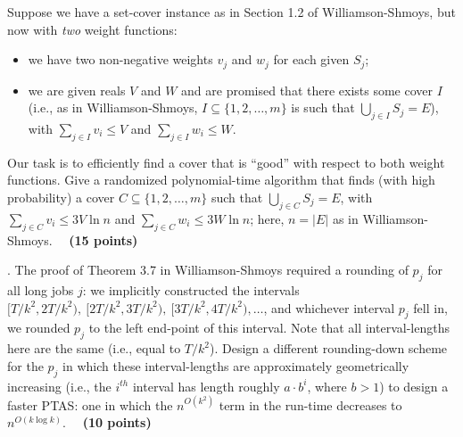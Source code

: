 \documentclass{article}[11pt]
\begin{document}
Suppose we have a set-cover instance as in Section 1.2 of Williamson-Shmoys, but now with \emph{two} weight functions:
\begin{itemize}
\item we have two non-negative weights $v_j$ and $w_j$ for each given $S_j$;
\item we are given reals $V$ and $W$ and are promised that there exists some cover $I$ (i.e., as in Williamson-Shmoys, $I \subseteq \{1, 2, \ldots, m\}$ is such that $\bigcup_{j \in I} S_j = E$), with 
$\sum_{j \in I} v_i \leq V$ and $\sum_{j \in I} w_i \leq W$.
\end{itemize}
Our task is to efficiently find a cover that is ``good'' with respect to both weight functions. Give a randomized polynomial-time algorithm that finds (with high probability) a cover $C \subseteq \{1, 2, \ldots, m\}$ such that $\bigcup_{j \in C} S_j = E$, with $\sum_{j \in C} v_i \leq 3 V \ln n$ and $\sum_{j \in C} w_i \leq 3 W \ln n$; here, $n = |E|$ as in Williamson-Shmoys. 
~~\textbf{(15 points)} 

\medskip \medskip {}. 
The proof of Theorem 3.7 in Williamson-Shmoys required a rounding of $p_j$ for all long jobs $j$: we implicitly constructed the intervals $[T/k^2, 2T/k^2), ~[2T/k^2, 3T/k^2), ~[3T/k^2, 4T/k^2), \ldots$, and whichever interval $p_j$ fell in, we rounded $p_j$ to the left end-point of this interval. Note that all interval-lengths here are the same (i.e., equal to $T/k^2$). Design a different rounding-down scheme for the $p_j$ in which these interval-lengths are approximately geometrically increasing (i.e., the $i^{th}$ interval has length roughly $a \cdot b^i$, where $b > 1$) to design a faster PTAS: one in which the $n^{O(k^2)}$ term in the run-time decreases to $n^{O(k \log k)}$. ~~\textbf{(10 points)} 
\end{document}
